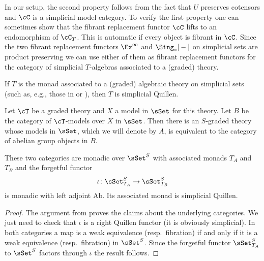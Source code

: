 \documentclass[leqno,oneside,english]{elsarticle}
\newcounter{enumisaved}
\newlength{\thmsaved}
\begin{document}
\begin{remark}
{{{    \setcounter{thm}{{\strip@pt{\thmsaved}}}  
  }{
    
  }
  \setcounter{enumi}{\theenumisaved}
    \else
  \fi
}}{}
  In our setup,	the second property follows from the fact that $U$ preserves cotensors and $\cC$ is a simplicial model category. To verify the first property one
  can sometimes show that the fibrant replacement functor $\cC$ lifts to
  an endomorphism of $\cC_T$. This is automatic if every object is fibrant
  in $\cC$. Since the two fibrant replacement functors
  $\Ex^{\infty}$ and $\Sing_{*}|-|$ on simplicial sets are product
  preserving we can use either of them as fibrant replacement functors
  for the category of simplicial $T$-algebras associated to a (graded) theory.
\end{remark}

\begin{prop}
\label{prop:algebraic-theories-are-quillen}
  If $T$ is the monad associated to a (graded) algebraic theory on
  simplicial sets (such as, e.g., those in  or
  ), then $T$ is simplicial Quillen.
\end{prop}

\begin{prop}\label{prop:abelianization-adjunction-model-cats}
 Let $\cT$ be a graded theory and $X$ a model in $\sSet$ for this
 theory.  Let $B$ be the category of $\cT$-models over $X$ in
 $\sSet$.  Then there is an $S$-graded theory whose models in $\sSet$,
 which we will denote by $A$, is equivalent to the category of abelian
 group objects in $B$.

 These two categories are monadic over $\sSet^S$ with associated
 monads $T_{A}$ and $T_{B}$ and the forgetful functor 
 \[ 
  \iota\colon\sSet^{S}_{T_{A}}\rightarrow \sSet^{S}_{T_{B}} 
 \]
 is monadic with left adjoint $\textrm{Ab}$. Its associated
 monad is simplicial Quillen.
\end{prop}
\begin{proof}
  The argument from  proves the claims about the underlying categories. We just need to check that $\iota$ is a right Quillen functor (it is obviously simplicial). 
  In both categories a map is a weak equivalence (resp.~fibration) if
  and only if it is a weak equivalence (resp.~fibration) in $\sSet^S$.
  Since the forgetful functor $\sSet^S_{T_A}$ to $\sSet^S$ factors
  through $\iota$ the result follows.
\end{proof}
\end{document}
